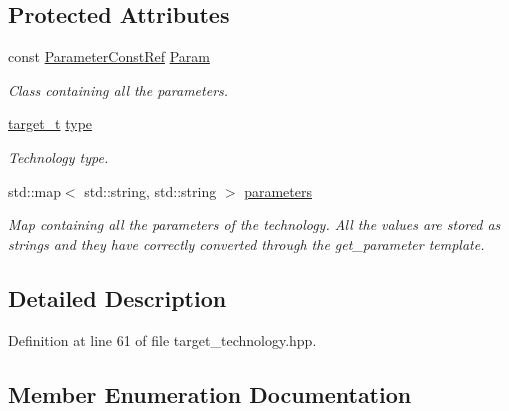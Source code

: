 \subsection*{Protected Attributes}
\begin{DoxyCompactItemize}
\item 
const \hyperlink{Parameter_8hpp_a37841774a6fcb479b597fdf8955eb4ea}{Parameter\+Const\+Ref} \hyperlink{classtarget__technology_a6d8af451d6dc438c539419db44410329}{Param}
\begin{DoxyCompactList}\small\item\em Class containing all the parameters. \end{DoxyCompactList}\item 
\hyperlink{classtarget__technology_a84257c2d384aa7dce6a060105113459b}{target\+\_\+t} \hyperlink{classtarget__technology_a0591e52e0dc59d81f3dc96f7ef9f7081}{type}
\begin{DoxyCompactList}\small\item\em Technology type. \end{DoxyCompactList}\item 
std\+::map$<$ std\+::string, std\+::string $>$ \hyperlink{classtarget__technology_a5ceb29f981b52a8f1ab4ce1d2ff38de5}{parameters}
\begin{DoxyCompactList}\small\item\em Map containing all the parameters of the technology. All the values are stored as strings and they have correctly converted through the get\+\_\+parameter template. \end{DoxyCompactList}\end{DoxyCompactItemize}


\subsection{Detailed Description}


Definition at line 61 of file target\+\_\+technology.\+hpp.



\subsection{Member Enumeration Documentation}
\mbox{\label{classtarget__technology_a84257c2d384aa7dce6a060105113459b}} 
